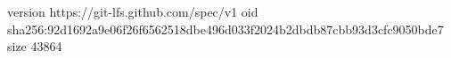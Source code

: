 version https://git-lfs.github.com/spec/v1
oid sha256:92d1692a9e06f26f6562518dbe496d033f2024b2dbdb87cbb93d3cfc9050bde7
size 43864
